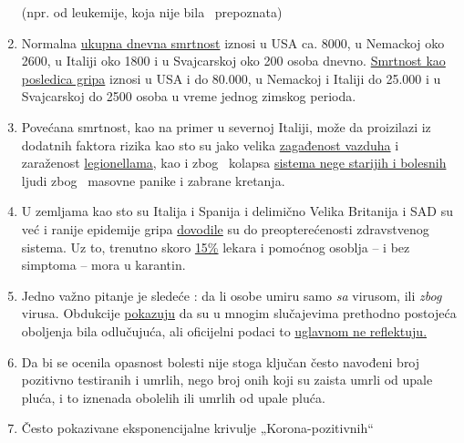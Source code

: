 \begin{enumerate}
  (npr. od leukemije, koja nije bila~ prepoznata)
\item
  Normalna \href{https://www.euromomo.eu/index.html}{ukupna dnevna
  smrtnost} iznosi u USA ca. 8000, u Nemackoj oko 2600, u Italiji oko
  1800 i u Svajcarskoj oko 200 osoba dnevno.
  \href{https://www.statnews.com/2018/09/26/cdc-us-flu-deaths-winter/}{Smrtnost
  kao posledica gripa} iznosi u USA i do 80.000, u Nemackoj i Italiji do
  25.000 i u Svajcarskoj do 2500 osoba u vreme jednog zimskog perioda.
\item
  Povećana smrtnost, kao na primer u severnoj Italiji, može da
  proizilazi iz dodatnih faktora rizika kao sto su jako velika
  \href{https://www.heise.de/tp/features/Feinstaubpartikel-als-Viren-Vehikel-4687454.html}{zagađenost
  vazduha} i zaraženost
  \href{https://www.apotheke-adhoc.de/nachrichten/detail/coronavirus/erhoehen-legionellen-die-todesrate-einer-corona-infektion/}{legionellama},
  kao i zbog~ kolapsa
  \href{https://www.sueddeutsche.de/politik/coronavirus-pflegekraefte-ausland-1.4866124}{sistema
  nege starijih i bolesnih} ljudi zbog~ masovne panike i zabrane
  kretanja.
\item
  U zemljama kao sto su Italija i Spanija i delimično Velika Britanija i
  SAD su već i ranije epidemije gripa
  \href{https://off-guardian.org/2020/04/02/coronavirus-fact-check-1-flu-doesnt-overwhelm-our-hospitals/}{dovodile}
  su do preopterećenosti zdravstvenog sistema. Uz to, trenutno skoro
  \href{https://www.reuters.com/article/us-health-coronavirus-spain-morgue-idUSKBN21B1PP}{15\%}
  lekara i pomoćnog osoblja -- i bez simptoma -- mora u karantin.
\item
  Jedno važno pitanje je sledeće : da li osobe umiru samo \emph{sa}
  virusom, ili \emph{zbog} virusa. Obdukcije
  \href{https://www.abendblatt.de/hamburg/article228828787/rechtsmedizin-pueschel-hamburg-corona-virus-infektion-covid-19-coronavirus-krise-patienten-krankenhaeuser-kliniken-infektionsrate-krankheit-pandemie-test-lungenkrankheit-sars-cov-epidemie-sars-cov-2.html}{pokazuju}
  da su u mnogim slučajevima prethodno postojeća oboljenja bila
  odlučujuća, ali oficijelni podaci to
  \href{https://swprs.org/rki-relativiert-corona-todesfaelle/}{uglavnom
  ne reflektuju.}
\item
  Da bi se ocenila opasnost bolesti nije stoga ključan često navođeni
  broj pozitivno testiranih i umrlih, nego broj onih koji su zaista
  umrli od upale pluća, i to iznenada obolelih ili umrlih od upale
  pluća.
\item
  Često pokazivane eksponencijalne krivulje „Korona-pozitivnih``

\end{enumerate}
